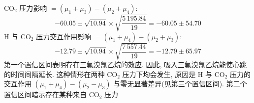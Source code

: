 \noindent $\mathrm{CO}_{2}$ 压力影响 $=(\mu_{1}+\mu_{3})-(\mu_{2}+\mu_{4})$:
\[
-60.05\pm\sqrt{10.94}\times\sqrt{\frac{5\,195.84}{19}}=-60.05\pm 54.70
\]
H 与 $\mathrm{CO}_{2}$ 压力交互作用影响 $=(\mu_{1}+\mu_{4})-(\mu_{2}+\mu_{3})$:
\[
-12.79\pm\sqrt{10.94}\times\sqrt{\frac{7\,557.44}{19}}=-12.79\pm 65.97
\]
第一个置信区间表明存在三氟溴氯乙烷的效应. 因此, 吸入三氟溴氯乙烷能使心跳的时间间隔延长. 这种情形在两种 $\mathrm{CO}_{2}$ 压力下均会发生, 原因是 H 与 $\mathrm{CO}_{2}$ 压力的交互作用 $(\mu_{1}+\mu_{4})-(\mu_{2}-\mu_{3})$ 与零无显著差异(见第三个置信区间). 第二个置信区间暗示存在某种来自 $\mathrm{CO}_{2}$ 压力
